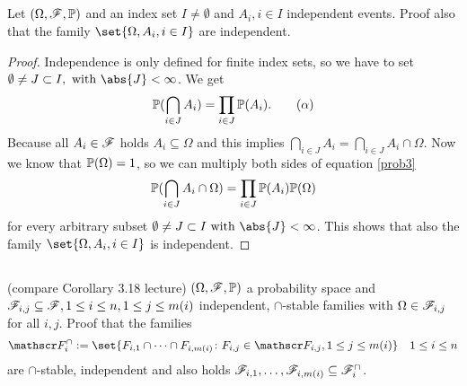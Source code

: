 \subsection{}
Let $(\Omega, \mathscr{F}, \mathbb{P})$ and an index set $I \neq \emptyset$ and $A_i, i \in I$ independent events. Proof also that the family $\set{\Omega, A_i , i \in I}$ are independent.
\begin{proof}
	Independence is only defined for finite index sets, so we have to set $\emptyset \neq J \subset I, \with \abs{J} < \infty$. 
	We get
	\begin{align*}
		\mathbb{P}(\bigcap_{i \in J}A_i) = \prod_{i \in J}\mathbb{P}(A_i). \label{prob3}\tag{$\alpha$}
	\end{align*}
	Because all $A_i \in \mathscr{F}$ holds $A_i \subseteq \Omega$ and this implies $\bigcap_{i \in J} A_i = \bigcap_{i \in J} A_i \cap \Omega$. Now we know that $\mathbb{P}(\Omega) = 1$, so we can multiply both sides of equation \ref{prob3}
	\begin{align*}
		\mathbb{P}(\bigcap_{i \in J}A_i \cap \Omega) = \prod_{i \in J}\mathbb{P}(A_i)\mathbb{P}(\Omega)
	\end{align*}
	for every arbitrary subset $\emptyset \neq J \subset I \with \abs{J} < \infty$. 
	This shows that also the family $\set{\Omega, A_i , i \in I}$ is independent.
\end{proof}
\subsection{}(compare Corollary 3.18 lecture)
$(\Omega, \mathscr{F}, \mathbb{P})$ a probability space and $\mathscr{F}_{i,j} \subseteq \mathscr{F}, 1 \le i \le n, 1 \le j \le m(i)$ independent, $\cap$-stable families with $\Omega \in \mathscr{F}_{i,j}$ for all $i,j$. Proof that the families
\begin{align*}
	\F_i^{\cap} := \set{F_{i,1} \cap \cdots \cap F_{i, m(i)} \colon F_{i,j} \in \F_{i,j}, 1 \le j \le m(i)} \quad 1 \le i \le n
\end{align*}
are $\cap$-stable, independent and also holds $\mathscr{F}_{i,1},\dots, \mathscr{F}_{i,m(i)} \subseteq \mathscr{F}_i^{\cap}$.


